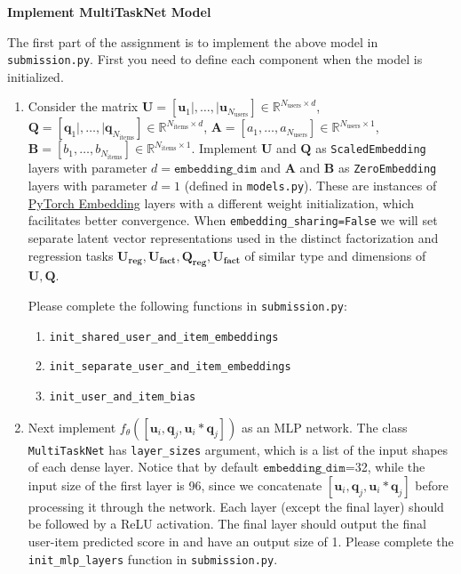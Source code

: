 \item {\bf Implement MultiTaskNet Model}

The first part of the assignment is to implement the above model in \texttt{submission.py}. First you need to define each component when the model is initialized. 

\begin{enumerate}
    \item {} Consider the matrix $\mathbf{U} = [\mathbf{u}_1\mid,\ldots,\mid \mathbf{u}_{N_{\text{users}}}]\in\mathbb{R}^{N_{\text{users}}\times d}$, $\mathbf{Q} = [\mathbf{q}_1\mid,\ldots,\mid\mathbf{q}_{N_{\text{items}}}]\in\mathbb{R}^{N_{\text{items}}\times d}$, $\mathbf{A} = [a_1, \ldots, a_{N_{\text{users}}}]\in \mathbb{R}^{N_{\text{users}}\times 1}$, $\mathbf{B} = [b_1, \ldots, b_{N_{\text{items}}}]\in \mathbb{R}^{N_{\text{items}}\times 1}$. Implement $\mathbf{U}$ and $\mathbf{Q}$ as \texttt{ScaledEmbedding} layers  with parameter $d=\texttt{embedding\_dim}$ and $\mathbf{A}$ and $\mathbf{B}$ as \texttt{ZeroEmbedding} layers with parameter $d=1$ (defined in \texttt{models.py}). These are instances of \href{https://pytorch.org/docs/stable/generated/torch.nn.Embedding.html}{PyTorch Embedding} layers with a different weight initialization, which facilitates better convergence.
    When \texttt{embedding\_sharing=False} we will set separate latent vector representations used in the distinct factorization and regression tasks $\mathbf{U_{reg}}, \mathbf{U_{fact}}, \mathbf{Q_{reg}}, \mathbf{U_{fact}}$ of similar type and dimensions of $\mathbf{U}, \mathbf{Q}$. 
    
    Please complete the following functions in \texttt{submission.py}:
    \begin{enumerate}
        \item \texttt{init\_shared\_user\_and\_item\_embeddings}
        \item \texttt{init\_separate\_user\_and\_item\_embeddings}
        \item \texttt{init\_user\_and\_item\_bias}
    \end{enumerate}

    \item {} Next implement $f_{\theta}([\mathbf{u}_i, \mathbf{q}_j, \mathbf{u}_i * \mathbf{q}_j])$ as an MLP network. The class \texttt{MultiTaskNet} has \texttt{layer\_sizes} argument, which is a list of the input shapes of each dense layer. Notice that by default $\texttt{embedding\_dim}$=32, while the input size of the first layer is 96, since we concatenate $[\mathbf{u}_i, \mathbf{q}_j, \mathbf{u}_i * \mathbf{q}_j]$ before processing it through the network. Each layer (except the final layer) should be followed by a ReLU activation. The final layer should output the final user-item predicted score in and have an output size of 1. Please complete the \texttt{init\_mlp\_layers} function in \texttt{submission.py}.
\end{enumerate}